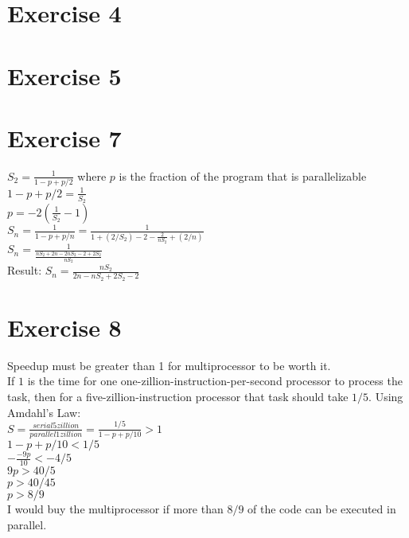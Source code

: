 \documentclass{article}
\begin{document}
\begin{adjustwidth}{-2cm}{-2cm}
\section{Exercise 4}


\section{Exercise 5}


\section{Exercise 7}
$S_{2} = \frac{1}{1-p+p/2}$ where $p$ is the fraction of the program that is parallelizable\\
$1-p+p/2 = \frac{1}{S_{2}}$\\
$p = -2(\frac{1}{S_{2}} - 1)$\\
$S_{n} = \frac{1}{1-p+p/n} = \frac{1}{1+(2/S_{2})-2-\frac{2}{nS_{2}}+(2/n)}$\\
$S_{n} = \frac{1}{\frac{nS_{2}+2n-2nS_{2}-2+2S_{2}}{nS_{2}}}$\\
Result: $S_{n} = \frac{nS_{2}}{2n-nS_{2}+2S_{2}-2}$

\section{Exercise 8}
Speedup must be greater than 1 for multiprocessor to be worth it.\\
If $1$ is the time for one one-zillion-instruction-per-second processor to process the task, then for a five-zillion-instruction processor that task should take $1/5$.
Using Amdahl's Law:\\
$S = \frac{serial 5zillion}{parallel 1zillion} = \frac{1/5}{1-p+p/10} > 1$\\
$1-p+p/10 < 1/5$\\
$-\frac{-9p}{10}< -4/5$\\
$9p > 40/5$\\
$p > 40/45$\\
$p > 8/9$\\
I would buy the multiprocessor if more than $8/9$ of the code can be executed in parallel.

\end{adjustwidth}
\end{document}
